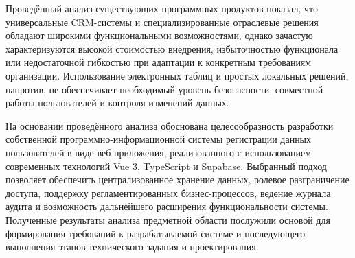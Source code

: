 Проведённый анализ существующих программных продуктов показал, что универсальные CRM-системы и специализированные отраслевые решения обладают широкими функциональными возможностями, однако зачастую характеризуются высокой стоимостью внедрения, избыточностью функционала или недостаточной гибкостью при адаптации к конкретным требованиям организации. Использование электронных таблиц и простых локальных решений, напротив, не обеспечивает необходимый уровень безопасности, совместной работы пользователей и контроля изменений данных.

На основании проведённого анализа обоснована целесообразность разработки собственной программно-информационной системы регистрации данных пользователей в виде веб-приложения, реализованного с использованием современных технологий Vue 3, TypeScript и Supabase. Выбранный подход позволяет обеспечить централизованное хранение данных, ролевое разграничение доступа, поддержку регламентированных бизнес-процессов, ведение журнала аудита и возможность дальнейшего расширения функциональности системы. Полученные результаты анализа предметной области послужили основой для формирования требований к разрабатываемой системе и последующего выполнения этапов технического задания и проектирования.


